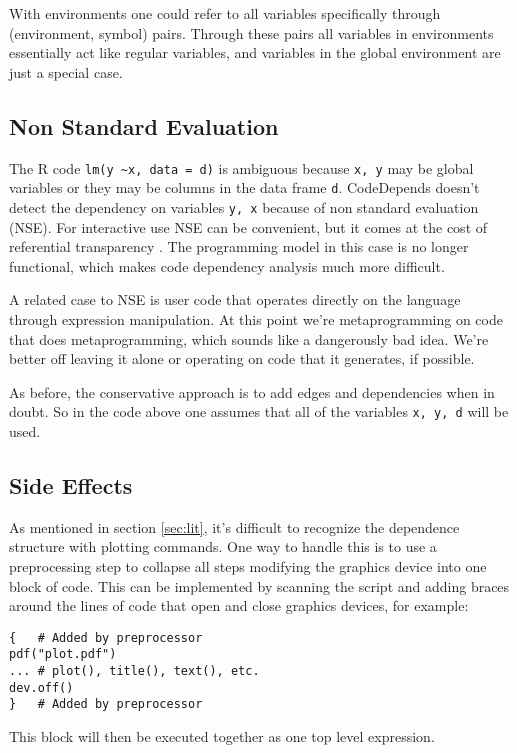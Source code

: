 \documentclass[12pt]{article}
\begin{document}
With environments one could refer to all variables specifically through
(environment, symbol) pairs. Through these pairs all variables in
environments essentially act like regular variables, and variables in the
global environment are just a special case.

\subsection{Non Standard Evaluation}

The R code \texttt{lm(y \textasciitilde x, data = d)} is ambiguous because
\texttt{x, y} may be global variables or they may be columns in the data
frame \texttt{d}. CodeDepends doesn't detect the dependency on variables
\texttt{y, x} because of non standard evaluation (NSE). For interactive use
NSE can be convenient, but it comes at the cost of referential transparency
\cite{wickham2015advanced}. The programming model in this case is no longer
functional, which makes code dependency analysis much more difficult.

A related case to NSE is user code that operates directly on the language
through expression manipulation. At this point we're metaprogramming on
code that does metaprogramming, which sounds like a dangerously bad idea.
We're better off leaving it alone or operating on code that it generates,
if possible.

As before, the conservative approach is to add edges and dependencies when in
doubt. So in the code above one assumes that all of the variables
\texttt{x, y, d} will be used.

\subsection{Side Effects}

As mentioned in section \ref{sec:lit}, it's difficult to recognize the
dependence structure with plotting commands. One way to handle this is to
use a preprocessing step to collapse all steps modifying the graphics
device into one block of code. This can be implemented by scanning the
script and adding braces around the lines of code that open and close
graphics devices, for example:

\begin{verbatim}
{   # Added by preprocessor
pdf("plot.pdf")
... # plot(), title(), text(), etc.
dev.off()
}   # Added by preprocessor
\end{verbatim}

This block will then be executed together as one top level expression.
\end{document}
